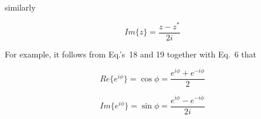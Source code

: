 \documentclass[12pt]{article}
\begin{document}
\begin{itemize}
\begin{itemize}
    \noindent
    similarly
    
    \begin{equation}
      \label{eq:Im}
      Im\{z\} = \frac{z - z^*}{2i}
    \end{equation}

    For example, it follows from Eq.'s~18%
    and 19%
    together with Eq.~6%
    that

    \begin{equation}
      \nonumber
      Re\{e^{i\phi}\} = \cos \phi = \frac{e^{i\phi} + e^{-i\phi}}{2}
    \end{equation}

    \begin{equation}
      Im\{e^{i\phi}\} = \sin \phi = \frac{e^{i\phi} - e^{-i\phi}}{2i}
    \end{equation}
    
  \end{itemize}

\end{itemize}
\end{document}
